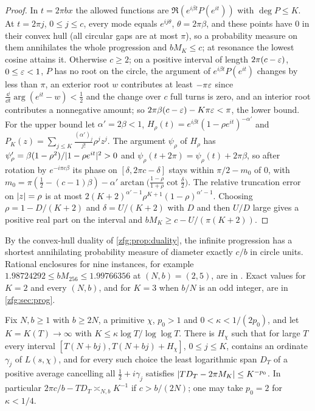 \begin{proof}
In $t=2\pi bx$ the allowed functions are $\Re(e^{i\beta t}P(e^{it}))$ with $\deg P\le K$. At $t=2\pi j$, $0\le j\le c$, every mode equals
$e^{ij\theta}$, $\theta=2\pi\beta$, and these points have $0$ in their convex hull (all circular gaps are at most $\pi$), so a
probability measure on them annihilates the whole progression and $bM_K\le c$; at resonance the lowest cosine
attains it. Otherwise $c\ge2$; on a positive interval of length $2\pi(c-\varepsilon)$, $0\le\varepsilon<1$, $P$ has no root on the circle,
the argument of $e^{i\beta t}P(e^{it})$ changes by less than $\pi$, an exterior root $w$ contributes at least $-\pi\varepsilon$ since
$\frac{\dd}{\dd t}\arg(e^{it}-w)<\tfrac12$ and the change over $c$ full turns is zero, and an interior root contributes a
nonnegative amount; so $2\pi\beta(c-\varepsilon)-K\pi\varepsilon<\pi$, the lower bound. For the upper bound let $\alpha'=2\beta<1$,
$H_\rho(t)=e^{i\beta t}(1-\rho e^{it})^{-\alpha'}$ and $P_K(z)=\sum_{j\le K}\frac{(\alpha')_j}{j!}\rho^jz^j$. The argument $\psi_\rho$ of $H_\rho$ has
$\psi_\rho'=\beta(1-\rho^2)/\lvert1-\rho e^{it}\rvert^2>0$ and $\psi_\rho(t+2\pi)=\psi_\rho(t)+2\pi\beta$, so after rotation by $e^{-i\pi c\beta}$ its phase on
$[\delta,2\pi c-\delta]$ stays within $\pi/2-m_0$ of $0$, with
$m_0=\pi(\tfrac12-(c-1)\beta)-\alpha'\arctan\bigl(\frac{1-\rho}{1+\rho}\cot\frac\delta2\bigr)$. The relative truncation error on $\lvert z\rvert=\rho$ is at most
$2(K+2)^{\alpha'-1}\rho^{K+1}(1-\rho)^{\alpha'-1}$. Choosing $\rho=1-D/(K+2)$ and $\delta=U/(K+2)$ with $D$ and then $U/D$ large gives a
positive real part on the interval and $bM_K\ge c-U/(\pi(K+2))$.
\end{proof}

By the convex-hull duality of \cref{zfg:prop:duality}, the infinite progression has a shortest annihilating
probability measure of diameter exactly $c/b$ in circle units. Rational enclosures for nine instances, for
example $1.98724292\le bM_{256}\le1.99766356$ at $(N,b)=(2,5)$, are in .
Exact values for $K=2$ and every $(N,b)$, and for $K=3$ when $b/N$ is an odd integer, are in \cref{zfg:sec:prog}.

\begin{theorem}\label{rec:thm:twopack}
Fix $N,b\ge1$ with $b\ge2N$, a primitive $\chi$, $p_0>1$ and $0<\kappa<1/(2p_0)$, and let $K=K(T)\to\infty$ with
$K\le\kappa\log T/\log\log T$. There is $H_\chi$ such that for large $T$ every interval $[T(N+bj),T(N+bj)+H_\chi]$, $0\le j\le K$, contains
an ordinate $\gamma_j$ of $L(s,\chi)$, and for every such choice the least logarithmic span $D_T$ of a positive average
cancelling all $\tfrac12+i\gamma_j$ satisfies $\lvert TD_T-2\pi M_K\rvert\le K^{-p_0}$. In particular $2\pi c/b-TD_T\asymp_{N,b}K^{-1}$ if $c>b/(2N)$; one
may take $p_0=2$ for $\kappa<1/4$.
\end{theorem}

